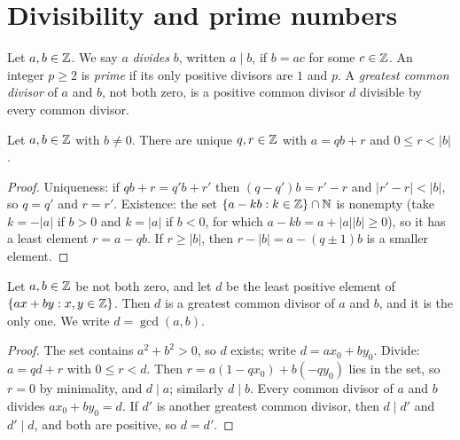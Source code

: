 \section{Divisibility and prime numbers}\label{number-systems:section-divisibility}

\begin{definition}\label{number-systems:definition-divisibility}
Let $a, b \in \mathbb{Z}$. We say $a$ \emph{divides} $b$, written $a \mid b$, if $b = ac$
for some $c \in \mathbb{Z}$. An integer $p \geq 2$ is \emph{prime} if its only positive
divisors are $1$ and $p$. A \emph{greatest common divisor} of $a$ and $b$, not
both zero, is a positive common divisor $d$ divisible by every common divisor.
\end{definition}

\begin{theorem}\label{number-systems:theorem-division}
Let $a, b \in \mathbb{Z}$ with $b \neq 0$. There are unique $q, r \in \mathbb{Z}$ with
$a = qb + r$ and $0 \leq r < |b|$.
\end{theorem}

\begin{proof}
Uniqueness: if $qb + r = q'b + r'$ then $(q - q')b = r' - r$ and
$|r' - r| < |b|$, so $q = q'$ and $r = r'$. Existence: the set
$\{a - kb : k \in \mathbb{Z}\} \cap \mathbb{N}$ is nonempty (take $k = -|a|$ if $b > 0$ and
$k = |a|$ if $b < 0$, for which $a - kb = a + |a||b| \geq 0$), so it has a least
element $r = a - qb$. If
$r \geq |b|$, then $r - |b| = a - (q \pm 1)b$ is a smaller element.
\end{proof}

\begin{theorem}[B\'ezout]\label{number-systems:theorem-bezout}
Let $a, b \in \mathbb{Z}$ be not both zero, and let $d$ be the least positive element of
$\{ax + by : x, y \in \mathbb{Z}\}$. Then $d$ is a greatest common divisor of $a$ and
$b$, and it is the only one. We write $d = \gcd(a, b)$.
\end{theorem}

\begin{proof}
The set contains $a^2 + b^2 > 0$, so $d$ exists; write $d = ax_0 + by_0$. Divide:
$a = qd + r$ with $0 \leq r < d$. Then $r = a(1 - qx_0) + b(-qy_0)$ lies in the set,
so $r = 0$ by minimality, and $d \mid a$; similarly $d \mid b$. Every common
divisor of $a$ and $b$ divides $ax_0 + by_0 = d$. If $d'$ is another greatest
common divisor, then $d \mid d'$ and $d' \mid d$, and both are positive, so
$d = d'$.
\end{proof}

